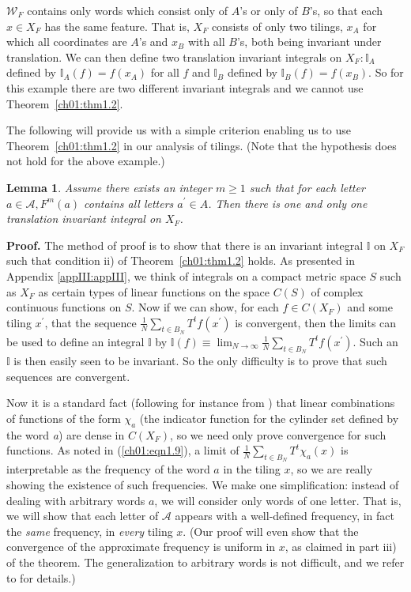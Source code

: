 \documentclass[reqno]{stml-l}
\theoremstyle{plain}
\newtheorem{lemma}[theorem]{Lemma}
\theoremstyle{definition}
\numberwithin{equation}{chapter}
\begin{document}
\noindent $\mathcal{W}_{F}$ contains only words which consist only of $A$'s or only of $B$'s, so that each $x\in X_{F}$ has the same feature. That is, $X_{F}$ consists of only two tilings, $x_{A}$ for which all coordinates are $A$'s and $x_{B}$ with all $B$'s, both being invariant under translation. We can then define two translation invariant integrals on $X_{F}:\mathbb{I}_{A}$ defined by $\mathbb{I}_{A}(f)=f(x_{A})$ for all $f$ and $\mathbb{I}_{B}$ defined by $\mathbb{I}_{B}(f)=f(x_{B})$. So for this example there are two different invariant integrals and we cannot use Theorem~\ref{ch01:thm1.2}.

The following will provide us with a simple criterion enabling us to use Theorem~\ref{ch01:thm1.2} in our analysis of tilings. (Note that the hypothesis does not hold for the above example.)

\begin{lemma}\label{ch01:lem1.5}
Assume there exists an integer $m\geq 1$ such that for each letter $a\in \mathcal{A},F^{m}(a)$ contains all letters $a^{\prime}\in A$. Then there is one and only one translation invariant integral on $X_{F}$.
\end{lemma}

\noindent \textbf{Proof.} The method of proof is to show
that there is an invariant integral $\mathbb{I}$ on $X_{F}$
such that condition ii) of Theorem~\ref{ch01:thm1.2} holds.
As presented in Appendix \ref{appIII:appIII}, we think of integrals on a
compact metric space $S$ such as $X_{F}$ as certain types
of linear functions on the space
$C(S)$ of complex continuous
functions on $S$. Now if we can show, for each $f\in
C(X_{F})$ and some tiling $x^{\prime}$, that the sequence
$\frac{1}{N}\sum\nolimits_{t\in B_{N}}T^{t}f(x^{\prime})$
is convergent, then the limits can be used to define an
integral $\mathbb{I}$ by
$\mathbb{I}(f)\equiv\lim_{N\rightarrow\infty}\frac{1}{N}\sum\nolimits_{t\in
B_{N}}T^{t}f(x^{\prime})$. Such an $\mathbb{I}$ is then
easily seen to be invariant. So the only difficulty is to
prove that such sequences are convergent.

Now it is a standard fact (following for instance from \cite[p. 172]{bib:Tay}) that linear combinations of functions of the form $\chi_{a}$ (the indicator function for the cylinder set defined by the word \emph{a}) are dense in $C(X_{F})$, so we need only prove convergence for such functions. As noted in (\ref{ch01:eqn1.9}), a limit of $\frac{1}{N}\sum\nolimits_{t\in B_{N}}T^{t}\chi_{a}(x)$ is interpretable as the frequency of the word $a$ in the tiling $x$, so we are really showing the existence of such frequencies. We make one simplification: instead of dealing with arbitrary words $a$, we will consider only words of one letter. That is, we will show that each letter of $\mathcal{A}$ appears with a well-defined frequency, in fact the \emph{same} frequency, in \emph{every} tiling $x$. (Our proof will even show that the convergence of the approximate frequency is uniform in $x$, as claimed in part iii) of the theorem. The generalization to arbitrary words is not difficult, and we refer to \cite{bib:Ra3} for details.)
\end{document}
